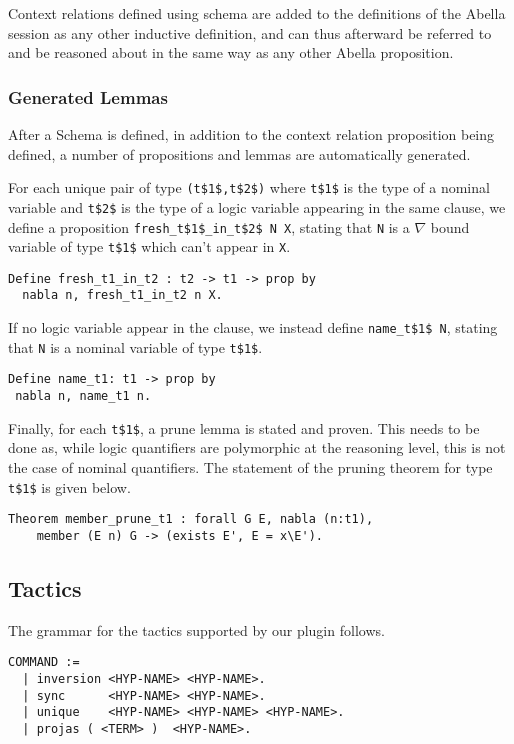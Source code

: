 \documentclass[nocopyrightspace,authoryear]{sigplanconf}
\begin{document}
Context relations defined using schema are added to the definitions of the Abella session as any other inductive definition, and can thus afterward be referred to and be reasoned about in the same way as any other Abella proposition.

\subsubsection{Generated Lemmas}

After a Schema is defined, in addition to the context relation proposition being defined, a number of propositions and lemmas are automatically generated.

For each unique pair of type \lstinline|(t$1$,t$2$)| where \lstinline|t$1$| is the type of a nominal variable and \lstinline|t$2$| is the type of a logic variable appearing in the same clause, we define a proposition \lstinline|fresh_t$1$_in_t$2$ N X|, stating that \lstinline|N| is a $\nabla$ bound variable of type \lstinline|t$1$| which can't appear in \lstinline|X|.

\begin{lstlisting}
Define fresh_t1_in_t2 : t2 -> t1 -> prop by
  nabla n, fresh_t1_in_t2 n X.
\end{lstlisting}

If no logic variable appear in the clause, we instead define \lstinline|name_t$1$ N|, stating that \lstinline|N| is a nominal variable of type \lstinline|t$1$|.

\begin{lstlisting}
Define name_t1: t1 -> prop by
 nabla n, name_t1 n.
\end{lstlisting}

Finally, for each \lstinline|t$1$|, a prune lemma is stated and proven. This needs to be done as, while logic quantifiers are polymorphic at the reasoning level, this is not the case of nominal quantifiers. The statement of the pruning theorem for type \lstinline|t$1$| is given below.
\begin{lstlisting}
Theorem member_prune_t1 : forall G E, nabla (n:t1), 
    member (E n) G -> (exists E', E = x\E').
\end{lstlisting}

\subsection{Tactics}
The grammar for the tactics supported by our plugin follows.
\begin{lstlisting}
COMMAND :=
  | inversion <HYP-NAME> <HYP-NAME>.
  | sync      <HYP-NAME> <HYP-NAME>.
  | unique    <HYP-NAME> <HYP-NAME> <HYP-NAME>.
  | projas ( <TERM> )  <HYP-NAME>.
\end{lstlisting}
\end{document}
